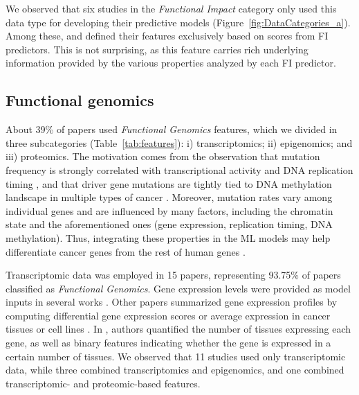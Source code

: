 We observed that six studies \cite{U2014, Anoosha2015, Tavanaei2017, Agajanian2018, Zhu2019, Wang2020} in the \textit{Functional Impact} category only used this data type for developing their predictive models (Figure~\ref{fig:DataCategories_a}). Among these, \citet{Zhu2019} and \citet{Wang2020} defined their features exclusively based on scores from FI predictors. This is not surprising, as this feature carries rich underlying information provided by the various properties analyzed by each FI predictor. 

\subsection{Functional genomics}

About 39\% of papers used \textit{Functional Genomics} features, which we divided in three subcategories (Table~\ref{tab:features}): i) transcriptomics; ii) epigenomics; and iii) proteomics. The motivation comes from the observation that mutation frequency is strongly correlated with transcriptional activity and DNA replication timing \cite{Jiang2019, lawrence2013mutational}, and that driver gene mutations are tightly tied to DNA methylation landscape in multiple types of cancer \cite{chen2017significant}. Moreover, mutation rates vary among individual genes and are influenced by many factors, including the chromatin state \cite{schuster2012chromatin} and the aforementioned ones (\ie gene expression, replication timing, DNA methylation). Thus, integrating these properties in the ML models may help differentiate cancer genes from the rest of human genes \cite{Nulsen2021}.

Transcriptomic data was employed in 15 papers, representing 93.75\% of papers classified as \textit{Functional Genomics}. Gene expression levels were provided as model inputs in several works \cite{Fu2012, Manolakos2014, Park2015, Guan2018}. Other papers summarized gene expression profiles by computing differential gene expression scores \cite{Gnad2015, Tokheim2016, Lu2018, Wang2018, Schulte-Sasse2019, Colaprico2020, Lyu2020} or average expression in cancer tissues or cell lines \cite{Jiang2019}. In \citet{Nulsen2021}, authors quantified the number of tissues expressing each gene, as well as binary features indicating whether the gene is expressed in a certain number of tissues. We observed that 11 studies used only transcriptomic data, while three \cite{Jiang2019, Schulte-Sasse2019, Lyu2020} combined transcriptomics and epigenomics, and one \cite{Nulsen2021} combined transcriptomic- and proteomic-based features. 

